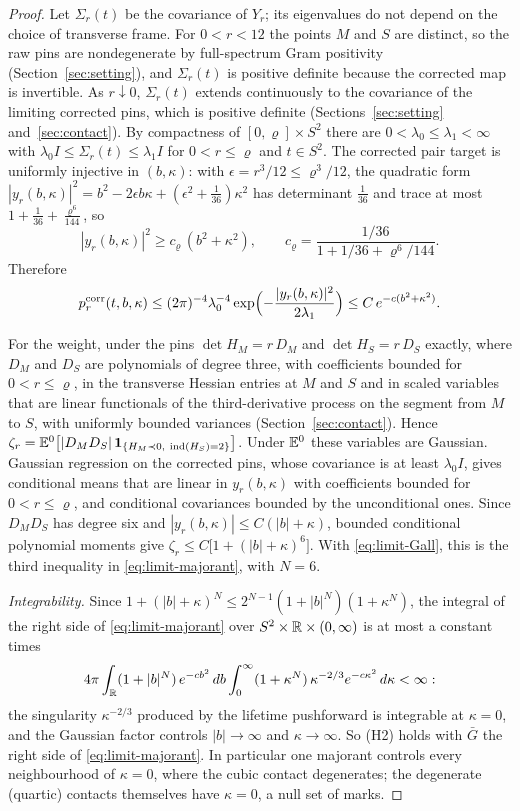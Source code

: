 \begin{proof}
Let $\Sigma_r(t)$ be the covariance of $Y_r$; its eigenvalues do not depend on the choice of transverse frame. For $0<r<12$ the points $M$ and $S$ are distinct, so the raw pins are nondegenerate by full-spectrum Gram positivity (Section~\ref{sec:setting}), and $\Sigma_r(t)$ is positive definite because the corrected map is invertible. As $r\downarrow0$, $\Sigma_r(t)$ extends continuously to the covariance of the limiting corrected pins, which is positive definite (Sections~\ref{sec:setting} and~\ref{sec:contact}). By compactness of $[0,\varrho]\times S^2$ there are $0<\lambda_0\le\lambda_1<\infty$ with $\lambda_0I\le\Sigma_r(t)\le\lambda_1I$ for $0<r\le\varrho$ and $t\in S^2$. The corrected pair target is uniformly injective in $(b,\kappa)$: with $\epsilon=r^3/12\le\varrho^3/12$, the quadratic form $|y_r(b,\kappa)|^2=b^2-2\epsilon b\kappa+(\epsilon^2+\tfrac1{36})\kappa^2$ has determinant $\frac1{36}$ and trace at most $1+\frac1{36}+\frac{\varrho^6}{144}$, so
\[
|y_r(b,\kappa)|^2\ge c_\varrho\,(b^2+\kappa^2),\qquad c_\varrho=\frac{1/36}{1+1/36+\varrho^6/144}.
\]
Therefore
\[
p^{\mathrm{corr}}_r(t,b,\kappa)\le(2\pi)^{-4}\lambda_0^{-4}\exp\Bigl(-\frac{|y_r(b,\kappa)|^2}{2\lambda_1}\Bigr)\le C\,e^{-c(b^2+\kappa^2)} .
\]

For the weight, under the pins $\det H_M=r\,D_M$ and $\det H_S=r\,D_S$ exactly, where $D_M$ and $D_S$ are polynomials of degree three, with coefficients bounded for $0<r\le\varrho$, in the transverse Hessian entries at $M$ and $S$ and in scaled variables that are linear functionals of the third-derivative process on the segment from $M$ to $S$, with uniformly bounded variances (Section~\ref{sec:contact}). Hence $\zeta_r=\E^0\bigl[|D_MD_S|\,\ind_{\{H_M\prec0,\ \Ind(H_S)=2\}}\bigr]$. Under $\mathbb E^0$ these variables are Gaussian. Gaussian regression on the corrected pins, whose covariance is at least $\lambda_0I$, gives conditional means that are linear in $y_r(b,\kappa)$ with coefficients bounded for $0<r\le\varrho$, and conditional covariances bounded by the unconditional ones. Since $D_MD_S$ has degree six and $|y_r(b,\kappa)|\le C(|b|+\kappa)$, bounded conditional polynomial moments give $\zeta_r\le C\bigl[1+(|b|+\kappa)^6\bigr]$. With \eqref{eq:limit-Gall}, this is the third inequality in \eqref{eq:limit-majorant}, with $N=6$.

\emph{Integrability.} Since $1+(|b|+\kappa)^N\le2^{N-1}(1+|b|^N)(1+\kappa^N)$, the integral of the right side of \eqref{eq:limit-majorant} over $S^2\times\mathbb R\times(0,\infty)$ is at most a constant times
\[
4\pi\int_{\mathbb R}(1+|b|^N)\,e^{-cb^2}\,db\int_0^\infty(1+\kappa^N)\,\kappa^{-2/3}e^{-c\kappa^2}\,d\kappa<\infty :
\]
the singularity $\kappa^{-2/3}$ produced by the lifetime pushforward is integrable at $\kappa=0$, and the Gaussian factor controls $|b|\to\infty$ and $\kappa\to\infty$. So (H2) holds with $\bar G$ the right side of \eqref{eq:limit-majorant}. In particular one majorant controls every neighbourhood of $\kappa=0$, where the cubic contact degenerates; the degenerate (quartic) contacts themselves have $\kappa=0$, a null set of marks.


\end{proof}
